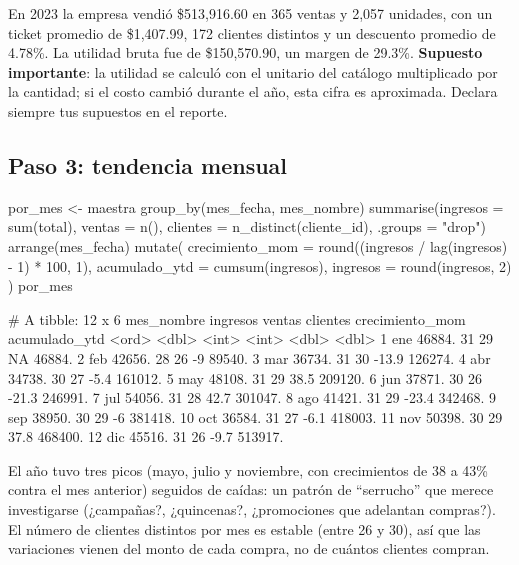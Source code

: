 En 2023 la empresa vendió \$513,916.60 en 365 ventas y 2,057 unidades, con un
ticket promedio de \$1,407.99, 172 clientes distintos y un descuento promedio
de 4.78\%. La utilidad bruta fue de \$150,570.90, un margen de 29.3\%.
\textbf{Supuesto importante}: la utilidad se calculó con el 
unitario del catálogo multiplicado por la cantidad; si el costo cambió
durante el año, esta cifra es aproximada. Declara siempre tus supuestos en
el reporte.

\subsection{Paso 3: tendencia mensual}

\begin{rcode}[title=Reporte mensual: tendencia]
por_mes <- maestra %
  group_by(mes_fecha, mes_nombre) %
  summarise(ingresos = sum(total), ventas = n(),
            clientes = n_distinct(cliente_id), .groups = "drop") %
  arrange(mes_fecha) %
  mutate(
    crecimiento_mom = round((ingresos / lag(ingresos) - 1) * 100, 1),
    acumulado_ytd   = cumsum(ingresos),
    ingresos        = round(ingresos, 2)
  )
por_mes %
\end{rcode}
\begin{rsalida}
# A tibble: 12 x 6
   mes_nombre ingresos ventas clientes crecimiento_mom acumulado_ytd
   <ord>         <dbl>  <int>    <int>           <dbl>         <dbl>
 1 ene          46884.     31       29            NA          46884.
 2 feb          42656.     28       26            -9          89540.
 3 mar          36734.     31       30           -13.9       126274.
 4 abr          34738.     30       27            -5.4       161012.
 5 may          48108.     31       29            38.5       209120.
 6 jun          37871.     30       26           -21.3       246991.
 7 jul          54056.     31       28            42.7       301047.
 8 ago          41421.     31       29           -23.4       342468.
 9 sep          38950.     30       29            -6         381418.
10 oct          36584.     31       27            -6.1       418003.
11 nov          50398.     30       29            37.8       468400.
12 dic          45516.     31       26            -9.7       513917.
\end{rsalida}

El año tuvo tres picos (mayo, julio y noviembre, con crecimientos de 38 a
43\% contra el mes anterior) seguidos de caídas: un patrón de
``serrucho'' que merece investigarse (¿campañas?, ¿quincenas?, ¿promociones
que adelantan compras?). El número de clientes distintos por mes es estable
(entre 26 y 30), así que las variaciones vienen del monto de cada compra, no
de cuántos clientes compran.

